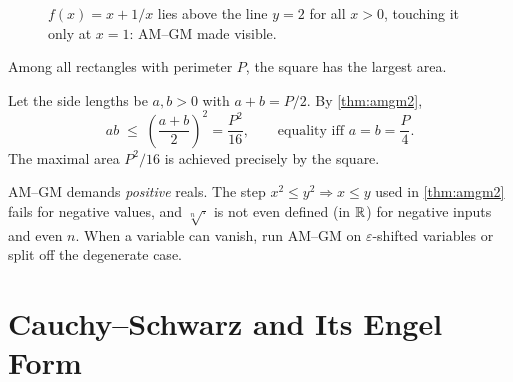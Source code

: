 \begin{figure}[ht]
  \centering
  \caption{$f(x) = x + 1/x$ lies above the line $y = 2$ for all
  $x>0$, touching it only at $x=1$: AM--GM made visible.}
  \label{fig:x-reciprocal}
\end{figure}

\begin{example}\label{ex:perimeter}
Among all rectangles with perimeter $P$, the square has the largest
area.

\begin{exsolution}
Let the side lengths be $a, b > 0$ with $a + b = P/2$. By
\cref{thm:amgm2},
\[
  ab \;\le\; \left(\frac{a+b}{2}\right)^{\!2} = \frac{P^2}{16},
  \qquad\text{equality iff } a = b = \frac{P}{4}.
\]
The maximal area $P^2/16$ is achieved precisely by the square.
\end{exsolution}
\end{example}

\begin{pitfall}\label{pit:domain}
AM--GM demands \emph{positive} reals. The step $x^2 \le y^2
\Rightarrow x \le y$ used in \cref{thm:amgm2} fails for negative
values, and $\sqrt[n]{\cdot}$ is not even defined (in $\mathbb{R}$) for
negative inputs and even $n$. When a variable can vanish, run AM--GM
on $\varepsilon$-shifted variables or split off the degenerate case.
\end{pitfall}

\section{Cauchy--Schwarz and Its Engel Form}
\label{sec:cs}

